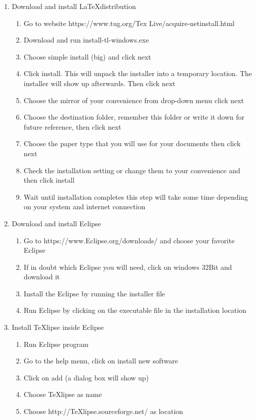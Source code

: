 \documentclass{memoir}
\begin{document}
\begin{enumerate}
  \item Download and install \LaTeX  distribution
\begin{enumerate}
  \item Go to website https://www.tug.org/Tex Live/acquire-netinstall.html 
  \item Download and run install-tl-windows.exe
  \item Choose simple install (big) and click next
  \item Click install. This will unpack the installer into a temporary location. The installer will show up afterwards. Then click next
  \item Choose the mirror of your convenience from drop-down menu click next
  \item Choose the destination folder, remember this folder or write it down for future reference, then click next
  \item Choose the paper type that you will use for your documents then click next
  \item Check the installation setting or change them to your convenience and then click install
  \item Wait until installation completes this step will take some time depending on your system and internet connection
\end{enumerate}
\item Download and install Eclipse
\begin{enumerate}
  \item Go to https://www.Eclipse.org/downloads/ and choose your favorite Eclipse
  \item If in doubt which Eclipse you will need, click on windows 32Bit and download it
  \item Install the Eclipse by running the installer file
  \item Run Eclipse by clicking on the executable file in the installation location
\end{enumerate}
  \item Install TeXlipse inside Eclipse
  \begin{enumerate}
    \item Run Eclipse program 
    \item Go to the help menu, click on install new software
    \item Click on add (a dialog box will show up)
    \item Choose TeXlipse as name
    \item Choose http://TeXlipse.sourceforge.net/ as location

\end{enumerate}
\end{enumerate}
\end{document}
